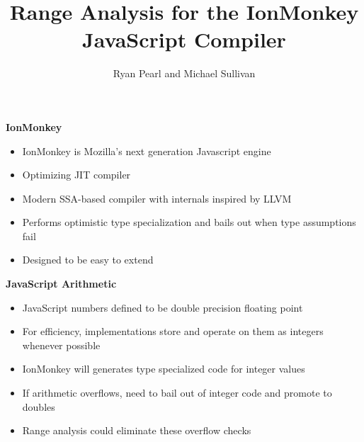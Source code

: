 \documentclass{slides}
\begin{document}
\title{\bf Range Analysis for the IonMonkey JavaScript Compiler}
\author{Ryan Pearl and Michael Sullivan}

\maketitle

\begin{slide}
\begin{center}
{\Huge \bf{IonMonkey}}
\end{center}

\begin{itemize}
\item IonMonkey is Mozilla's next generation Javascript engine
\item Optimizing JIT compiler
\item Modern SSA-based compiler with internals inspired by LLVM
\item Performs optimistic type specialization and bails out when type
  assumptions fail
\item Designed to be easy to extend
\end{itemize}
\end{slide}

\begin{slide}
\begin{center}
{\Huge \bf{JavaScript Arithmetic}}
\end{center}
\begin{itemize}
\item JavaScript numbers defined to be double precision floating point
\item For efficiency, implementations store and operate on them as
  integers whenever possible
\item IonMonkey will generates type specialized code for integer values
\item If arithmetic overflows, need to bail out of integer code and
  promote to doubles
\item Range analysis could eliminate these overflow checks
\end{itemize}
\end{slide}
\end{document}
